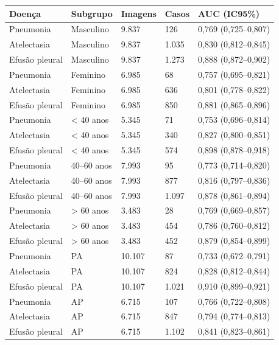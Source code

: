\begin{tabular}{lllll}
\toprule
Doença & Subgrupo & Imagens & Casos & AUC (IC95\%) \\
\midrule
Pneumonia & Masculino & 9.837 & 126 & 0,769 (0,725–0,807) \\
Atelectasia & Masculino & 9.837 & 1.035 & 0,830 (0,812–0,845) \\
Efusão pleural & Masculino & 9.837 & 1.273 & 0,888 (0,872–0,902) \\
Pneumonia & Feminino & 6.985 & 68 & 0,757 (0,695–0,821) \\
Atelectasia & Feminino & 6.985 & 636 & 0,801 (0,778–0,822) \\
Efusão pleural & Feminino & 6.985 & 850 & 0,881 (0,865–0,896) \\
Pneumonia & < 40 anos & 5.345 & 71 & 0,753 (0,696–0,814) \\
Atelectasia & < 40 anos & 5.345 & 340 & 0,827 (0,800–0,851) \\
Efusão pleural & < 40 anos & 5.345 & 574 & 0,898 (0,878–0,918) \\
Pneumonia & 40–60 anos & 7.993 & 95 & 0,773 (0,714–0,820) \\
Atelectasia & 40–60 anos & 7.993 & 877 & 0,816 (0,797–0,836) \\
Efusão pleural & 40–60 anos & 7.993 & 1.097 & 0,878 (0,861–0,894) \\
Pneumonia & > 60 anos & 3.483 & 28 & 0,769 (0,669–0,857) \\
Atelectasia & > 60 anos & 3.483 & 454 & 0,786 (0,760–0,812) \\
Efusão pleural & > 60 anos & 3.483 & 452 & 0,879 (0,854–0,899) \\
Pneumonia & PA & 10.107 & 87 & 0,733 (0,672–0,791) \\
Atelectasia & PA & 10.107 & 824 & 0,828 (0,812–0,844) \\
Efusão pleural & PA & 10.107 & 1.021 & 0,910 (0,899–0,921) \\
Pneumonia & AP & 6.715 & 107 & 0,766 (0,722–0,808) \\
Atelectasia & AP & 6.715 & 847 & 0,794 (0,774–0,813) \\
Efusão pleural & AP & 6.715 & 1.102 & 0,841 (0,823–0,861) \\
\bottomrule
\end{tabular}
